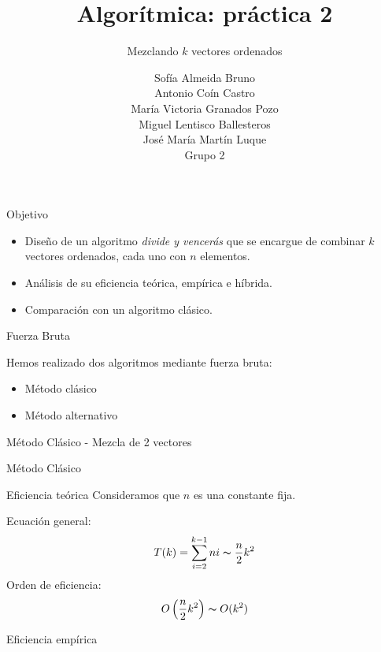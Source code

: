 \documentclass[spanish]{beamer}
\title{Algorítmica: práctica 2}
\subtitle{Mezclando $k$ vectores ordenados}
\author{Sofía Almeida Bruno\\ Antonio Coín Castro\\ María Victoria Granados Pozo\\ Miguel Lentisco Ballesteros\\ José María Martín Luque\\ \vspace{1em}Grupo 2}
\begin{document}
\maketitle

\begin{frame}{Objetivo}

	\begin{itemize}
		\item Diseño de un algoritmo \textit{divide y vencerás} que se encargue de combinar $k$ vectores ordenados, cada uno con $n$ elementos.
		\item Análisis de su eficiencia teórica, empírica e híbrida.
		\item Comparación con un algoritmo clásico.
	\end{itemize}

\end{frame}

\begin{frame}{Fuerza Bruta}

	Hemos realizado dos algoritmos mediante fuerza bruta:
	\begin{itemize}
		\item Método clásico
		\item Método alternativo
	\end{itemize}
\end{frame}

\begin{frame}{Método Clásico - Mezcla de 2 vectores}

	
\end{frame}

\begin{frame}{Método Clásico}
	
\end{frame}

\begin{frame}{Eficiencia teórica}
    \vspace{-1em}
    Consideramos que $n$ es una constante fija.
    
    \vskip 1cm 
	Ecuación general: $$T(k) = \sum_{i=2}^{k-1} ni \thicksim \frac{n}{2}k^2$$
	Orden de eficiencia: $$O\left(\frac{n}{2}k^2\right) \thicksim O(k^2) $$

\end{frame}

\begin{frame}{Eficiencia empírica}
	\begin{center}
		\resizebox*{11cm}{!}{
			}
	\end{center}

\end{frame}
\end{document}
